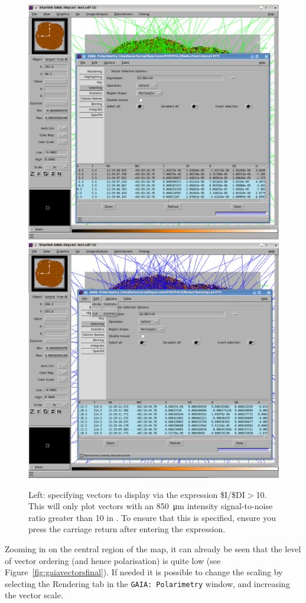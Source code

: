 \begin{figure}[t!]
\begin{center}
\includegraphics[width=0.46\linewidth]{sc22-gaia-plot-vectors-4.png}
\includegraphics[width=0.46\linewidth]{sc22-gaia-plot-vectors-6.png}
\caption [Selecting Vectors in GAIA]{Left: specifying vectors
  to display via the expression \$I/\$DI$>$10. This will only plot
  vectors with an \SI{850}{\micro\metre} intensity signal-to-noise
  ratio greater than 10 in \GAIA. To ensure that this is specified,
  ensure you press the carriage return after entering the expression.
}
\label{fig:gaiavectorssecond}
\end{center}
\end{figure}

Zooming in on the central region of the map, it can already be seen
that the level of vector ordering (and hence polarisation) is quite
low (see Figure~\ref{fig:gaiavectorsfinal}). If needed it is
possible to change the scaling by selecting the Rendering tab in the
\texttt{GAIA: Polarimetry} window, and increasing the vector scale.


